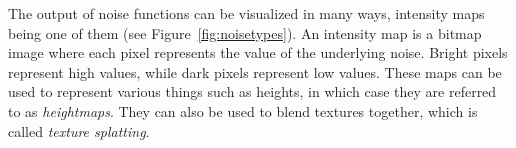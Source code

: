 The output of noise functions can be visualized in many ways, intensity maps being one of them (see Figure~\ref{fig:noisetypes}).
An intensity map is a bitmap image where each pixel represents the value of the underlying noise.
Bright pixels represent high values, while dark pixels represent low values.
These maps can be used to represent various things such as heights, in which case they are referred to as \textit{heightmaps}.
They can also be used to blend textures together, which is called \textit{texture splatting}.
